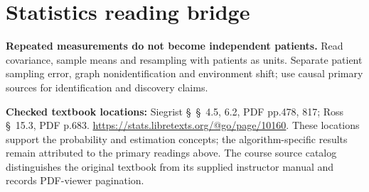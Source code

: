 \documentclass[11pt]{scrartcl}
\begin{document}
\section*{Statistics reading bridge}
\textbf{Repeated measurements do not become independent patients.} Read covariance, sample means and resampling with patients as units. Separate patient sampling error, graph nonidentification and environment shift; use causal primary sources for identification and discovery claims.

\textbf{Checked textbook locations:} Siegrist \S~\S~4.5, 6.2, PDF pp.478, 817; Ross \S~15.3, PDF p.683. \url{https://stats.libretexts.org/@go/page/10160}. These locations support the probability and estimation concepts; the algorithm-specific results remain attributed to the primary readings above. The course source catalog distinguishes the original textbook from its supplied instructor manual and records PDF-viewer pagination.
\end{document}
